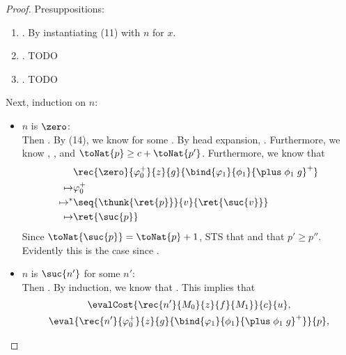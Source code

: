 \begin{proof}
Presuppositions: 
\begin{enumerate}
    \item {}. By instantiating (11) with $n$ for $x$. 
    \item {}. TODO
    \item {}. TODO
\end{enumerate}
Next, induction on $n$: 
\begin{itemize}
    \item $n$ is $\zero$:\\
    Then . By (14), we know  
    for some .
    By head expansion, . 
    Furthermore, we know , , and $\toNat{p} \ge c + \toNat{p'}$. Furthermore, we know that 
    \begin{align*}
        &\rec{\zero}{\varphi_0^+}{z}{g}{\bind{\varphi_1}{\phi_1}{\plus\;\phi_1\;g}^+}\\ 
        \mapsto & \varphi_0^+\\
        \mapsto^* &\seq{\thunk{\ret{p}}}{v}{\ret{\suc{v}}}\\
        \mapsto& \ret{\suc{p}}
    \end{align*}
    Since $\toNat{\suc{p}} = \toNat{p} + 1$, STS that
    and that $p' \ge p''$. Evidently this is the case since
    .
    \item $n$ is $\suc{n'}$ for some $n'$:\\
    Then . 
    By induction, we know that 
    {}{}
    {}. This implies that 
    \begin{gather}
    \evalCost{\rec{n'}{M_0}{z}{f}{M_1}}{c}{u}, \\
    \eval{\rec{n'}{\varphi_0^+}{z}{g}{\bind{\varphi_1}{\phi_1}{\plus\;\phi_1\;g}^+}}{p},\\

\end{gather}
\end{itemize}
\end{proof}
